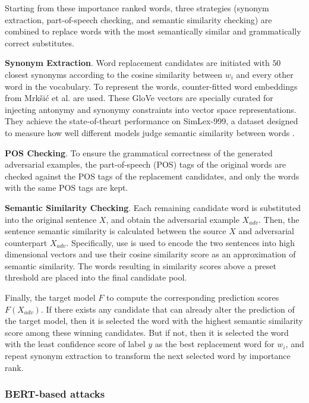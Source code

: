 Starting from these importance ranked words, three strategies (synonym extraction, part-of-speech checking, and semantic similarity checking) are combined to replace words with the most semantically similar and grammatically correct substitutes.

\textbf{Synonym Extraction}.
Word replacement candidates are initiated with $50$ closest synonyms according to the cosine similarity between $w_i$ and every other word in the vocabulary.
To represent the words, counter-fitted word embeddings from Mrkšić et al. \cite{conf/naacl/MrksicSTGRSVWY16} are used.
These GloVe vectors are specially curated for injecting antonymy and synonymy constraints into vector space representations. They achieve the state-of-theart performance on SimLex-999, a dataset designed to measure how well different models judge semantic similarity between words \cite{hill2014simlex999}.


\textbf{POS Checking}.
To ensure the grammatical correctness of the generated adversarial examples, the part-of-speech (POS) tags of the original words are checked against the POS tags of the replacement candidates, and only the words with the same POS tags are kept.

\textbf{Semantic Similarity Checking}.
Each remaining candidate word is substituted into the original sentence $X$, and obtain the adversarial example $X_{adv}$. Then, the sentence semantic similarity is calculated between the source $X$ and adversarial counterpart $X_{adv}$. Specifically, \acrfull{use} \cite{journals/corr/abs-1803-11175} is used to encode the two sentences into high dimensional vectors and use their cosine similarity score as an approximation of semantic similarity. The words resulting in similarity scores above a preset threshold are placed into the final candidate pool.

Finally, the target model $F$ to compute the corresponding prediction scores $F(X_{adv})$.
If there exists any candidate that can already alter the prediction of the target model, then it is selected the word with the highest semantic similarity score among these winning candidates. 
But if not, then it is selected the word with the least confidence score of label $y$ as the best replacement word for $w_i$, and repeat synonym extraction to transform the next selected word by importance rank.

\subsubsection{BERT-based attacks}\label{subsubsec:bert-based-attacks}


